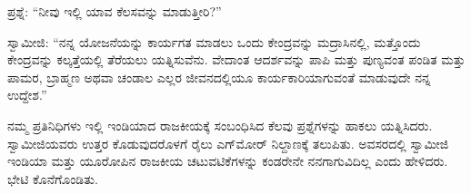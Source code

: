  ಪ್ರಶ್ನೆ: “ನೀವು ಇಲ್ಲಿ ಯಾವ ಕೆಲಸವನ್ನು ಮಾಡುತ್ತೀರಿ?” 

 ಸ್ವಾಮೀಜಿ: “ನನ್ನ ಯೋಜನೆಯನ್ನು ಕಾರ್ಯಗತ ಮಾಡಲು ಒಂದು ಕೇಂದ್ರವನ್ನು ಮದ್ರಾಸಿನಲ್ಲಿ, ಮತ್ತೊಂದು ಕೇಂದ್ರವನ್ನು ಕಲ್ಕತ್ತೆಯಲ್ಲಿ ತೆರೆಯಲು ಯತ್ನಿಸುವೆನು. ವೇದಾಂತ ಆದರ್ಶವನ್ನು ಪಾಪಿ ಮತ್ತು ಪುಣ್ಯವಂತ ಪಂಡಿತ ಮತ್ತು ಪಾಮರ, ಬ್ರಾಹ್ಮಣ ಅಥವಾ ಚಂಡಾಲ ಎಲ್ಲರ ಜೀವನದಲ್ಲಿಯೂ ಕಾರ್ಯಕಾರಿಯಾಗುವಂತೆ ಮಾಡುವುದೇ ನನ್ನ ಉದ್ದೇಶ.” 

 ನಮ್ಮ ಪ್ರತಿನಿಧಿಗಳು ಇಲ್ಲಿ ಇಂಡಿಯಾದ ರಾಜಕೀಯಕ್ಕೆ ಸಂಬಂಧಿಸಿದ ಕೆಲವು ಪ್ರಶ್ನೆಗಳನ್ನು ಹಾಕಲು ಯತ್ನಿಸಿದರು. ಸ್ವಾಮೀಜಿಯವರು ಉತ್ತರ ಕೊಡುವುದರೊಳಗೆ ರೈಲು ಎಗ್‌ಮೋರ್ ನಿಲ್ದಾಣಕ್ಕೆ ತಲುಪಿತು. ಅವಸರದಲ್ಲಿ ಸ್ವಾಮೀಜಿ ಇಂಡಿಯಾ ಮತ್ತು ಯೂರೋಪಿನ ರಾಜಕೀಯ ಚಟುವಟಿಕೆಗಳನ್ನು ಕಂಡರೇನೇ ನನಗಾಗುವಿದಿಲ್ಲ ಎಂದು ಹೇಳಿದರು. ಭೇಟಿ ಕೊನೆಗೊಂಡಿತು. 

